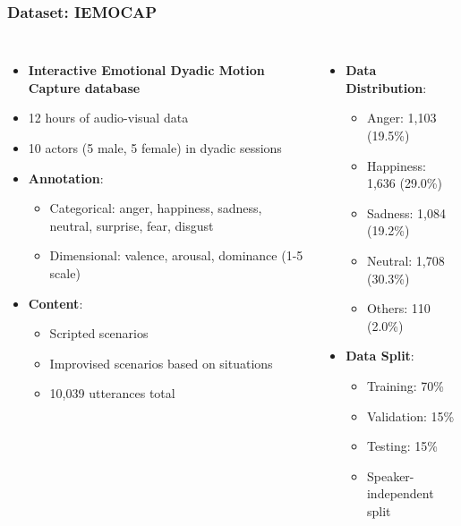 \documentclass{beamer}
\begin{document}
\begin{frame}
\frametitle{Dataset: IEMOCAP}
\begin{columns}
\begin{itemize}
    \item \textbf{Interactive Emotional Dyadic Motion Capture database}
    \item 12 hours of audio-visual data
    \item 10 actors (5 male, 5 female) in dyadic sessions
    \item \textbf{Annotation}:
    \begin{itemize}
        \item Categorical: anger, happiness, sadness, neutral, surprise, fear, disgust
        \item Dimensional: valence, arousal, dominance (1-5 scale)
    \end{itemize}
    \item \textbf{Content}:
    \begin{itemize}
        \item Scripted scenarios
        \item Improvised scenarios based on situations
        \item 10,039 utterances total
    \end{itemize}
\end{itemize}

\begin{itemize}
    \item \textbf{Data Distribution}:
    \begin{itemize}
        \item Anger: 1,103 (19.5\%)
        \item Happiness: 1,636 (29.0\%)
        \item Sadness: 1,084 (19.2\%)
        \item Neutral: 1,708 (30.3\%)
        \item Others: 110 (2.0\%)
    \end{itemize}
    \item \textbf{Data Split}:
    \begin{itemize}
        \item Training: 70\%
        \item Validation: 15\%
        \item Testing: 15\%
        \item Speaker-independent split
    \end{itemize}
\end{itemize}
\end{columns}
\end{frame}
\end{document}
